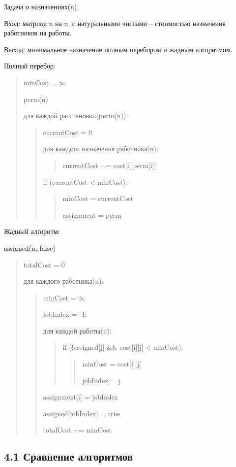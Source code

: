 \documentclass[]{article}
\begin{document}
Задача о назначениях(n)

Вход: матрица n на n, с натуральными числами -- стоимостью назначения
работников на работы.

Выход: минимальное назначение полным перебором и жадным алгоритмом.

Полный перебор:

\begin{quote}
minCost = {$\infty$}

perm(n)

для каждой расстановки(perm(n)):
\begin{quote}
currentCost = 0

для каждого назначения работника(n):
\begin{quote}
currentCost += cost{[}i{]}{[}perm{[}i{]}{]}~~
\end{quote}
if (currentCost \textless{} minCost):
\begin{quote}
minCost = currentCost

assignment = perm
\end{quote}
\end{quote}
\end{quote}
Жадный алгоритм:

assigned(n, false)

\begin{quote}
totalCost = 0

для каждого работника(n):
\begin{quote}
minCost = {$\infty$}

jobIndex = -1;

для каждой работы(n):
\begin{quote}
if (!assigned{[}j{]} \&\& cost{[}i{]}{[}j{]} \textless{} minCost):
\begin{quote}
minCost = cost{[}i{]}{[}j{]}

jobIndex = j
\end{quote}
\end{quote}
assignment{[}i{]} = jobIndex

assigned{[}jobIndex{]} = true

totalCost += minCost
\end{quote}
\end{quote}
\hypertarget{Сравнение алгоритмов}{%
\subsection{4.1 Сравнение
алгоритмов}\label{Сравнение алгоритмов}}
\end{document}
